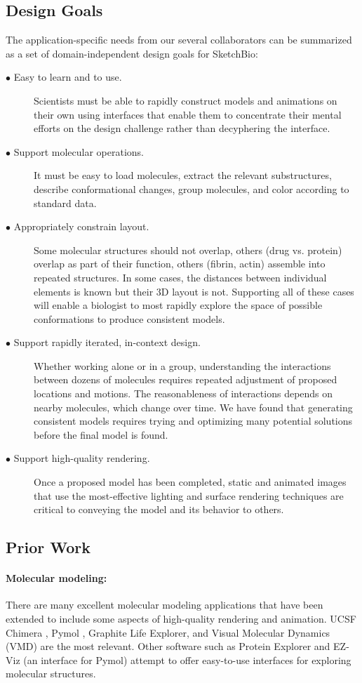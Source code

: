 \documentclass[twocolumn]{bmcart}%
\begin{document}
\subsection*{Design Goals}
The application-specific needs from our several collaborators can be summarized as a set of domain-independent design goals for SketchBio:
\begin{description}
  \item[$\bullet$ Easy to learn and to use.] Scientists must be able to rapidly construct models and animations on their own using interfaces that enable them to concentrate their mental efforts on the design challenge rather than decyphering the interface.
  \item[$\bullet$ Support molecular operations.] It must be easy to load molecules, extract the relevant substructures, describe conformational changes, group molecules, and color according to standard data.
  \item[$\bullet$ Appropriately constrain layout.] Some molecular structures should not overlap, others (drug vs. protein) overlap as part of their function, others (fibrin, actin) assemble into repeated structures.  In some cases, the distances between individual elements is known but their 3D layout is not.  Supporting all of these cases will enable a biologist to most rapidly explore the space of possible conformations to produce consistent models.
  \item[$\bullet$ Support rapidly iterated, in-context design.] Whether working alone or in a group, understanding the interactions between dozens of molecules requires repeated adjustment of proposed locations and motions.  The reasonableness of interactions depends on nearby molecules, which change over time.  We have found that generating consistent models requires trying and optimizing many potential solutions before the final model is found.
  \item[$\bullet$ Support high-quality rendering.] Once a proposed model has been completed, static and animated images that use the most-effective lighting and surface rendering techniques are critical to conveying the model and its behavior to others.
\end{description}


\subsection*{Prior Work}
\paragraph*{Molecular modeling:}
There are many excellent molecular modeling applications that have been extended to include some aspects of high-quality rendering and animation.
UCSF Chimera \cite{pettersen2004ucsf}, Pymol \cite{pymol2013}, Graphite Life Explorer\cite{hornus2013easy}, and Visual Molecular Dynamics (VMD) \cite{humphrey1996} are the most relevant.
Other software such as Protein Explorer \cite{martz2002protein} and EZ-Viz \cite{grell2006ez} (an interface for Pymol) attempt to offer easy-to-use interfaces for exploring molecular structures.
\end{document}
